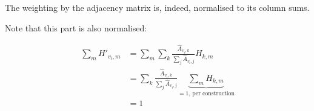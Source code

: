 The weighting by the adjacency matrix is, indeed, normalised to its column sums.

Note that this part is also normalised:

\begin{equation}
\begin{split}
	\sum_m H'_{v_i, m} & = \sum_m \sum_k \frac{\hat{A}_{v_i, k}}{\sum_j \hat{A}_{v_i, j}} H_{k, m} \\
	& = \sum_k \frac{\hat{A}_{v_i, k}}{\sum_j \hat{A}_{v_i, j}} \underbrace{\sum_m H_{k,m}}_{=1\text{, per construction}} \\
	& = 1
\end{split}
\end{equation}

\newpage
